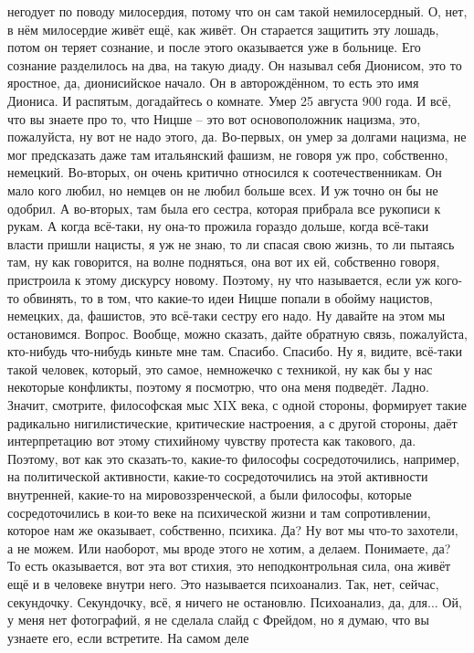 негодует по поводу милосердия, потому что он сам такой немилосердный. О, нет, в
нём милосердие живёт ещё, как живёт. Он старается защитить эту лошадь, потом он
теряет сознание, и после этого оказывается уже в больнице. Его сознание
разделилось на два, на такую диаду. Он называл себя Дионисом, это то яростное,
да, дионисийское начало. Он в авторождённом, то есть это имя Диониса. И
распятым, догадайтесь о комнате. Умер 25 августа 900 года. И всё, что вы знаете
про то, что Ницше – это вот основоположник нацизма, это, пожалуйста, ну вот не
надо этого, да. Во-первых, он умер за долгами нацизма, не мог предсказать даже
там итальянский фашизм, не говоря уж про, собственно, немецкий. Во-вторых, он
очень критично относился к соотечественникам. Он мало кого любил, но немцев он
не любил больше всех. И уж точно он бы не одобрил. А во-вторых, там была его
сестра, которая прибрала все рукописи к рукам. А когда всё-таки, ну она-то
прожила гораздо дольше, когда всё-таки власти пришли нацисты, я уж не знаю, то
ли спасая свою жизнь, то ли пытаясь там, ну как говорится, на волне подняться,
она вот их ей, собственно говоря, пристроила к этому дискурсу новому. Поэтому,
ну что называется, если уж кого-то обвинять, то в том, что какие-то идеи Ницше
попали в обойму нацистов, немецких, да, фашистов, это всё-таки сестру его надо.
Ну давайте на этом мы остановимся. Вопрос. Вообще, можно сказать, дайте обратную
связь, пожалуйста, кто-нибудь что-нибудь киньте мне там. Спасибо. Спасибо. Ну я,
видите, всё-таки такой человек, который, это самое, немножечко с техникой, ну
как бы у нас некоторые конфликты, поэтому я посмотрю, что она меня подведёт.
Ладно. Значит, смотрите, философская мыс XIX века, с одной стороны, формирует
такие радикально нигилистические, критические настроения, а с другой стороны,
даёт интерпретацию вот этому стихийному чувству протеста как такового, да.
Поэтому, вот как это сказать-то, какие-то философы сосредоточились, например, на
политической активности, какие-то сосредоточились на этой активности внутренней,
какие-то на мировоззренческой, а были философы, которые сосредоточились в кои-то
веке на психической жизни и там сопротивлении, которое нам же оказывает,
собственно, психика. Да? Ну вот мы что-то захотели, а не можем. Или наоборот, мы
вроде этого не хотим, а делаем. Понимаете, да? То есть оказывается, вот эта вот
стихия, это неподконтрольная сила, она живёт ещё и в человеке внутри него. Это
называется психоанализ. Так, нет, сейчас, секундочку. Секундочку, всё, я ничего
не остановлю. Психоанализ, да, для... Ой, у меня нет фотографий, я не сделала
слайд с Фрейдом, но я думаю, что вы узнаете его, если встретите. На самом деле
